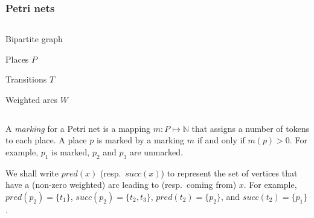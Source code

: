 \documentclass{beamer}              %
\begin{document}
\begin{frame}%
\frametitle{Petri nets}
  \begin{columns}
    \begin{column}{0.4\textwidth}
      Bipartite graph
      
      \hspace{0.8cm}
      
      Places \(P\)
      
      Transitions \(T\)
      
      Weighted arcs \(W\)
    \end{column}
    \begin{column}{0.6\textwidth}
      \centering
    \end{column}
  \end{columns}
  
  \hspace{0.8cm}
  
  A \emph{marking} for a Petri net is a mapping \(m : P \mapsto \mathbb{N}\) that assigns a number of tokens to each place.
  A place \(p\) is marked by a marking \(m\) if and only if \(m(p) > 0\). For example, \(p_1\) is marked, \(p_2\) and \(p_3\) are unmarked.
  
  \hspace{0.8cm}
  
  We shall write \(pred(x)\) (resp.\ \(succ(x)\)) to represent the set of vertices that have a (non-zero weighted) arc leading to (resp.\ coming from) \(x\). For example, \(pred(p_2) = \{t_1\}\), \(succ(p_2) = \{t_2, t_3\}\), \(pred(t_2) = \{p_2\}\), and \(succ(t_2) = \{p_1\}\).
  
\end{frame}
\end{document}
